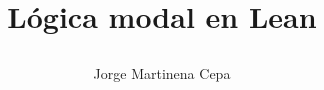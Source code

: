 \documentclass[12pt]{ucmthesis}
\title{{\huge Lógica modal en Lean\par}}
\author{Jorge Martinena Cepa}
\begin{document}
\maketitle


\begin{romanpages}
  
  \tableofcontents
\end{romanpages}








\cleardoublepage
{}


\end{document}
